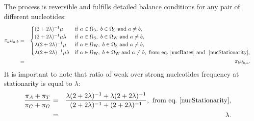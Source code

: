 \documentclass{article}
\newcommand{\SetWeak}{\Omega_{\mathrm{W}}}
\newcommand{\SetStrong}{\Omega_{\mathrm{S}}}
\begin{document}
    The process is reversible and fulfills detailed balance conditions for any pair of different nucleotides:
    \begin{eqnarray}
        \pi_a u_{a, b}
        & = &
        \begin{cases}
            ( 2 + 2 \lambda)^{-1} \mu
            & \mathrm{if} \ a \in \SetStrong, \ b \in \SetStrong \ \mathrm{ and } \ a \neq b,\\
            ( 2 + 2 \lambda)^{-1} \mu \lambda
            & \mathrm{if} \ a \in \SetStrong, \ b \in \SetWeak \ \mathrm{ and } \ a \neq b, \\
            \lambda  ( 2 + 2 \lambda)^{-1} \mu
            & \mathrm{if} \ a \in \SetWeak, \ b \in \SetStrong \ \mathrm{ and } \ a \neq b,\\
            \lambda ( 2 + 2 \lambda)^{-1} \mu \lambda
            & \mathrm{if} \ a \in \SetWeak, \ b \in \SetWeak \ \mathrm{ and } \ a \neq b, \ \textrm{from eq.}\ \ref{nucRates} \text{ and } \ \ref{nucStationarity},
        \end{cases} \\
        & = & \pi_b u_{b, a} .
        \label{nucMutBalance}
    \end{eqnarray}
    It is important to note that ratio of weak over strong nucleotides frequency at stationarity is equal to $\lambda$:
    \begin{eqnarray}
        \label{lambda}
        \dfrac{ \pi_A + \pi_T }{ \pi_C + \pi_G }
        & = & \dfrac{ \lambda ( 2 + 2 \lambda)^{-1} + \lambda ( 2 + 2 \lambda)^{-1}}{ ( 2 + 2 \lambda)^{-1} +  ( 2 + 2 \lambda)^{-1}}, \ \textrm{from eq.}\ \ref{nucStationarity},\\
        & = & \lambda .
    \end{eqnarray}
\end{document}
